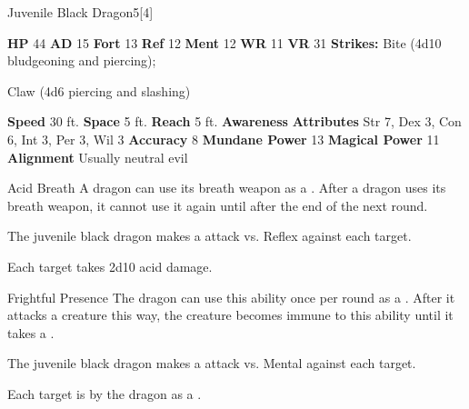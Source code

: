   \begin{monsubsection}{Juvenile Black Dragon}{5}[4]
    \vspace{-1em}\vspace{-1em}
    \vspace{0em}

    
    

    \begin{spellcontent}
      \begin{spelltargetinginfo}
        \pari \textbf{HP} 44 \monsep
          \textbf{AD} 15 \monsep
          \textbf{Fort} 13 \monsep
          \textbf{Ref} 12 \monsep
          \textbf{Ment} 12
        \pari \textbf{WR} 11 \monsep
        \textbf{VR} 31
        \pari \textbf{Strikes:}
            Bite  (4d10 bludgeoning and piercing);
\par Claw  (4d6 piercing and slashing)
      \end{spelltargetinginfo}
    \end{spellcontent}
    \begin{monsterfooter}
      \pari \textbf{Speed} 30 ft. \monsep
        \textbf{Space} 5 ft. \monsep
        \textbf{Reach} 5 ft.
      \pari \textbf{Awareness} 
      \pari \textbf{Attributes}
        Str 7, Dex 3,
        Con 6, Int 3,
        Per 3, Wil 3
      \pari \textbf{Accuracy} 8 \monsep
        \textbf{Mundane Power} 13 \monsep
      \textbf{Magical Power} 11
      \pari \textbf{Alignment} Usually neutral evil
    \end{monsterfooter}
  \end{monsubsection}
  \begin{freeability}{Acid Breath}
      A dragon can use its breath weapon as a .
      After a dragon uses its breath weapon, it cannot use it again until after the end of the next round.
      \par The juvenile black dragon makes a  attack
        vs. Reflex against each target.
    
    \hit Each target takes 2d10 acid damage.
    \end{freeability}
  

    \begin{freeability}{Frightful Presence}
      The dragon can use this ability once per round as a .
      After it attacks a creature this way, the creature becomes immune to this ability until it takes a .
      \par The juvenile black dragon makes a  attack
        vs. Mental against each target.
    
    \hit Each target is  by the dragon as a .
    \end{freeability}
  
